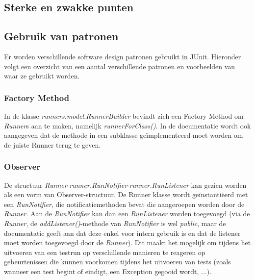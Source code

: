 \documentclass[i1]{oss}
\begin{document}

\subsection{Sterke en zwakke punten}

\subsection{Gebruik van patronen}

Er worden verschillende software design patronen gebruikt in JUnit. 
Hieronder volgt een overzicht van een aantal verschillende patronen en voorbeelden van waar ze gebruikt worden.

\subsubsection{Factory Method}
In de klasse \emph{runners.model.RunnerBuilder} bevindt zich een Factory Method om \emph{Runner}s aan te maken, namelijk \emph{runnerForClass()}. 
In de documentatie wordt ook aangegeven dat de methode in een subklasse ge\"implementeerd moet worden om de juiste Runner terug te geven.

\subsubsection{Observer}
De structuur \emph{Runner}-\emph{runner.RunNotifier}-\emph{runner.RunListener} kan gezien worden als een vorm van Observer-structuur. 
De Runner klasse wordt ge\"instanti\"eerd met een \emph{RunNotifier}, die notificatiemethoden bevat die aangeroepen worden door de \emph{Runner}. 
Aan de \emph{RunNotifier} kan dan een \emph{RunListener} worden toegevoegd (via de \emph{Runner}, de \emph{addListener()}-methode van \emph{RunNotifier} is wel \emph{public}, maar de documentatie geeft aan dat deze enkel voor intern gebruik is en dat de listener moet worden toegevoegd door de \emph{Runner}). 
Dit maakt het mogelijk om tijdens het uitvoeren van een testrun op verschillende manieren te reageren op gebeurtenissen die kunnen voorkomen tijdens het uitvoeren van tests (zoals wanneer een test begint of eindigt, een Exception gegooid wordt, ...).
\end{document}
